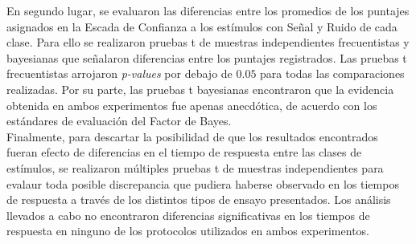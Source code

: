En segundo lugar, se evaluaron las diferencias entre los promedios de los puntajes asignados en la Escada de Confianza a los estímulos con Señal y Ruido de cada clase. Para ello se realizaron pruebas t de muestras independientes frecuentistas y bayesianas que señalaron diferencias entre los puntajes registrados. Las pruebas t frecuentistas arrojaron \textit{p-values} por debajo de $0.05$ para todas las comparaciones realizadas. Por su parte, las pruebas t bayesianas encontraron que la evidencia obtenida en ambos experimentos fue apenas anecdótica, de acuerdo con los estándares de evaluación del Factor de Bayes.\\

Finalmente, para descartar la posibilidad de que los resultados encontrados fueran efecto de diferencias en el tiempo de respuesta entre las clases de estímulos, se realizaron múltiples pruebas t de muestras independientes para evalaur toda posible discrepancia que pudiera haberse observado en los tiempos de respuesta a través de los distintos tipos de ensayo presentados. Los análisis llevados a cabo no encontraron diferencias significativas en los tiempos de respuesta en ninguno de los protocolos utilizados en ambos experimentos.\\



